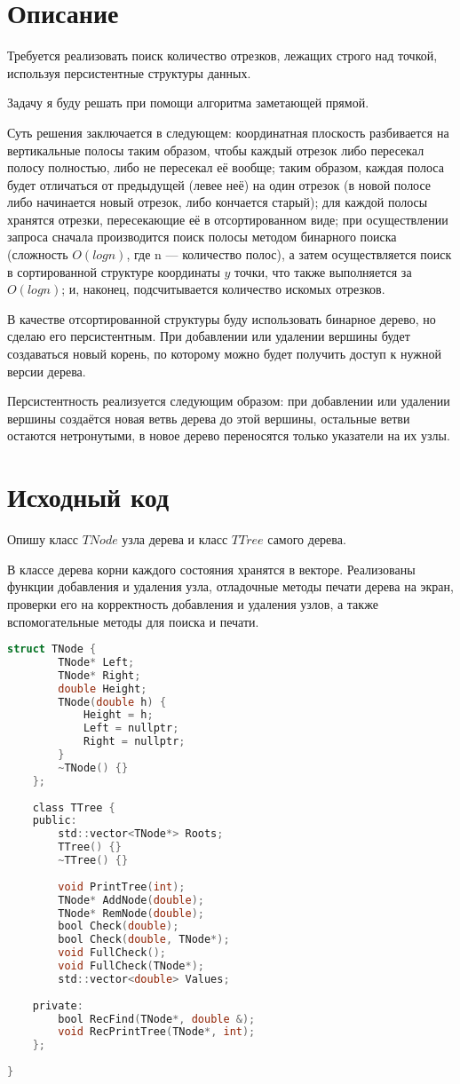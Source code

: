 \section{Описание}
Требуется реализовать поиск количество отрезков, лежащих строго над точкой, используя персистентные структуры данных.

Задачу я буду решать при помощи алгоритма заметающей прямой. 

Суть решения заключается в следующем: координатная плоскость разбивается на вертикальные полосы таким образом, чтобы каждый отрезок либо пересекал полосу полностью, либо не пересекал её вообще; таким образом, каждая полоса будет отличаться от предыдущей (левее неё) на один отрезок (в новой полосе либо начинается новый отрезок, либо кончается старый); для каждой полосы хранятся отрезки, пересекающие её в отсортированном виде; при осуществлении запроса сначала производится поиск полосы методом бинарного поиска (сложность $O(logn)$, где n --- количество полос), а затем осуществляется поиск в сортированной структуре координаты $y$ точки, что также выполняется за $O(logn)$; и, наконец, подсчитывается количество искомых отрезков.

В качестве отсортированной структуры буду использовать бинарное дерево, но сделаю его персистентным. При добавлении или удалении вершины будет создаваться новый корень, по которому можно будет получить доступ к нужной версии дерева.

Персистентность реализуется следующим образом: при добавлении или удалении вершины создаётся новая ветвь дерева до этой вершины, остальные ветви остаются нетронутыми, в новое дерево переносятся только указатели на их узлы.

\pagebreak

\section{Исходный код}
Опишу класс $TNode$ узла дерева и класс $TTree$ самого дерева. 

В классе дерева корни каждого состояния хранятся в векторе. Реализованы функции добавления и удаления узла, отладочные методы печати дерева на экран, проверки его на корректность добавления и удаления узлов, а также вспомогательные методы для поиска и печати. 

\begin{lstlisting}[language=C]
	struct TNode {
		TNode* Left;
		TNode* Right;
		double Height;
		TNode(double h) {
			Height = h;
			Left = nullptr;
			Right = nullptr;
		}
		~TNode() {}
	};
	
	class TTree {
	public:
		std::vector<TNode*> Roots;
		TTree() {}
		~TTree() {}
	
		void PrintTree(int);
		TNode* AddNode(double);
		TNode* RemNode(double);
		bool Check(double);
		bool Check(double, TNode*);
		void FullCheck();
		void FullCheck(TNode*);
		std::vector<double> Values;
	
	private:
		bool RecFind(TNode*, double &);
		void RecPrintTree(TNode*, int);
	};
	
}
	
\end{lstlisting}

